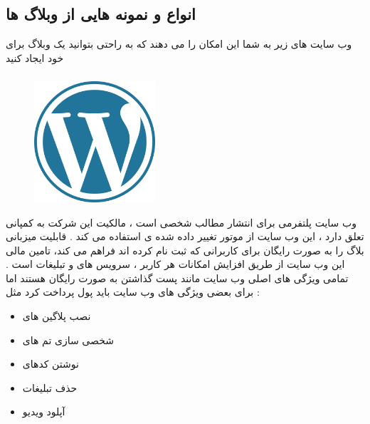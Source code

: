 \documentclass[12pt]{book}
\begin{document}
\subsection{انواع و نمونه هایی از وبلاگ ها}

وب سایت های زیر به شما این امکان را می دهند که به راحتی بتوانید یک وبلاگ برای خود ایجاد کنید 

\subsubsection{}


\begin{figure}
  \vspace{-20pt}
  \begin{center}
    \includegraphics[width=0.4\textwidth]{./WordPress_blue_logo.svg.png}
  \end{center}
  \vspace{-20pt}
  \caption{}
  \vspace{-10pt}
\end{figure}


وب سایت 
پلتفرمی برای انتشار مطالب شخصی است ، مالکیت این شرکت به کمپانی 
تعلق دارد ، این وب سایت از موتور تغییر داده شده ی 
استفاده می کند .
قابلیت میزبانی بلاگ را به صورت رایگان برای کاربرانی که ثبت نام کرده اند فراهم می کند، تامین مالی این وب سایت از طریق افزایش امکانات هر کاربر ، سرویس های 
و تبلیغات است .
تمامی ویژگی های اصلی وب سایت مانند پست گذاشتن به صورت رایگان هستند اما برای بعضی ویژگی های وب سایت باید پول پرداخت کرد مثل :

\begin{itemize}
	\item نصب پلاگین های 
	\item شخصی سازی تم های 
	\item نوشتن کدهای 
	\item حذف تبلیغات
	\item آپلود ویدیو
\end{itemize}
\end{document}
